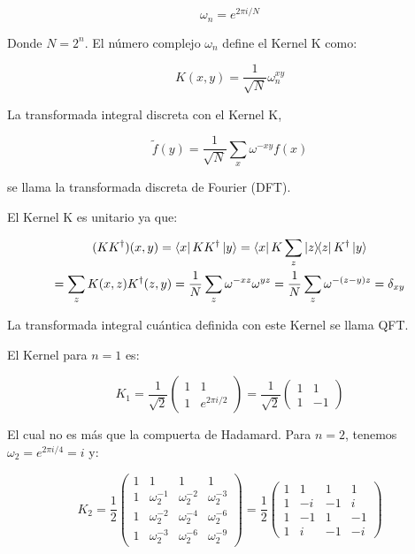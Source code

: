 \begin{equation}
    \omega_n = e^{2\pi i/N}
\end{equation}

Donde $N = 2^n$. El número complejo $\omega_n$ define el Kernel K como:

\begin{equation}
    K(x,y) = \frac{1}{\sqrt{N}} \omega_n^{x y}
\end{equation}

La transformada integral discreta con el Kernel K,

\begin{equation}
    \tilde{f}(y) = \frac{1}{\sqrt{N}} \sum\limits_x \omega^{-x y} f(x)
\end{equation}

se llama la transformada discreta de Fourier (DFT).

El Kernel K es unitario ya que:

\begin{multline}
    (K K^\dagger)(x,y) = \bra{x} K K^\dagger \ket{y}
    = \bra{x} K \sum\limits_z \ketbra{z}{z} K^\dagger \ket{y} \\
    = \sum\limits_z K(x,z) K^\dagger(z,y) 
    = \frac{1}{N} \sum\limits_z \omega^{-x z} \omega^{y z} 
    = \frac{1}{N} \sum\limits_z \omega^{- (z-y) z} 
    = \delta_{x y}
\end{multline}

La transformada integral cuántica definida con este Kernel se llama QFT.

El Kernel para $n = 1$ es:

\begin{equation}
    K_1 = \frac{1}{\sqrt{2}}
    \begin{pmatrix}
        1 & 1 \\
        1 & e^{2\pi i/2}
    \end{pmatrix} =
    \frac{1}{\sqrt{2}}
    \begin{pmatrix}
        1 & 1 \\
        1 & -1
    \end{pmatrix}
\end{equation}

El cual no es más que la compuerta de Hadamard. Para $n = 2$, tenemos $\omega_2 = e^{2\pi i/4} = i$ y:

\begin{equation}
    K_2 = \frac{1}{2}
    \begin{pmatrix}
        1 & 1 & 1 & 1 \\
        1 & \omega_2^{-1} & \omega_2^{-2} & \omega_2^{-3} \\
        1 & \omega_2^{-2} & \omega_2^{-4} & \omega_2^{-6} \\
        1 & \omega_2^{-3} & \omega_2^{-6} & \omega_2^{-9}
    \end{pmatrix} =
    \frac{1}{2}
    \begin{pmatrix}
        1 & 1 & 1 & 1 \\
        1 & -i & -1 & i \\
        1 & -1 & 1 & -1 \\
        1 & i & -1 & -i
    \end{pmatrix}
\end{equation}

